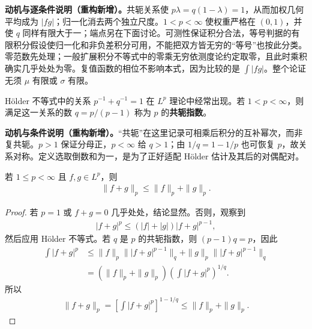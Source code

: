 \documentclass[../../main.tex]{subfiles}
\begin{document}
\begin{remark}
\textbf{动机与逐条件说明（重构新增）。}共轭关系使 $p\lambda=q(1-\lambda)=1$，从而加权几何平均成为 $|fg|$；归一化消去两个独立尺度。$1<p<\infty$ 使权重严格在 $(0,1)$，并使 $q$ 同样有限大于一；端点另在下面讨论。可测性保证积分合法，等号判据的有限积分假设使归一化和非负差积分可用，不能把双方皆无穷的“等号”也按此分类。零范数先处理；一般扩展积分不等式中的零乘无穷依测度论约定取零，且此时乘积确实几乎处处为零。复值函数的相位不影响本式，因为比较的是 $\int|fg|$。整个论证无须 $\mu$ 有限或 $\sigma$ 有限。
\end{remark}
\begin{definition}[共轭指数]\label{definition:ch06-conjugate-exponent}
Hölder 不等式中的关系 $p^{-1}+q^{-1}=1$ 在 $L^p$ 理论中经常出现。若 $1<p<\infty$，则满足这一关系的数 $q=p/(p-1)$ 称为 $p$ 的\textbf{共轭指数}。
\end{definition}
\begin{remark}
\textbf{动机与条件说明（重构新增）。}“共轭”在这里记录可相乘后积分的互补幂次，而非复共轭。$p>1$ 保证分母正，$p<\infty$ 给 $q>1$；由 $1/q=1-1/p$ 也可恢复 $p$，故关系对称。定义选取倒数和为一，是为了正好适配 Hölder 估计及其后的对偶配对。
\end{remark}
\begin{theorem}\label{theorem:ch06-minkowski}
若 $1\leqslant p<\infty$ 且 $f,g\in L^p$，则
\begin{align*}
\|f+g\|_p\leqslant\|f\|_p+\|g\|_p.
\end{align*}
\end{theorem}
\begin{proof}
若 $p=1$ 或 $f+g=0$ 几乎处处，结论显然。否则，观察到
\begin{align*}
|f+g|^p\leqslant(|f|+|g|)|f+g|^{p-1},
\end{align*}
然后应用 Hölder 不等式。若 $q$ 是 $p$ 的共轭指数，则 $(p-1)q=p$，因此
\begin{align*}
\int|f+g|^p
&\leqslant\|f\|_p\bigl\||f+g|^{p-1}\bigr\|_q
+\|g\|_p\bigl\||f+g|^{p-1}\bigr\|_q\\
&=(\|f\|_p+\|g\|_p)\left(\int|f+g|^p\right)^{1/q}.
\end{align*}
所以
\begin{align*}
\|f+g\|_p=\left[\int|f+g|^p\right]^{1-1/q}\leqslant\|f\|_p+\|g\|_p.
\end{align*}
\end{proof}
\end{document}
